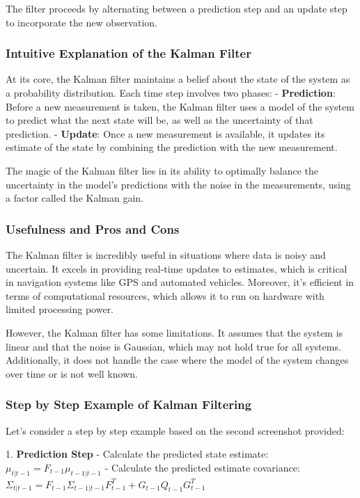 \documentclass{article}
\begin{document}
The filter proceeds by alternating between a prediction step and an update step to incorporate the new observation.

\subsubsection{Intuitive Explanation of the Kalman Filter}

At its core, the Kalman filter maintains a belief about the state of the system as a probability distribution. Each time step involves two phases:
- \textbf{Prediction}: Before a new measurement is taken, the Kalman filter uses a model of the system to predict what the next state will be, as well as the uncertainty of that prediction.
- \textbf{Update}: Once a new measurement is available, it updates its estimate of the state by combining the prediction with the new measurement.

The magic of the Kalman filter lies in its ability to optimally balance the uncertainty in the model's predictions with the noise in the measurements, using a factor called the Kalman gain.

\subsubsection{Usefulness and Pros and Cons}

The Kalman filter is incredibly useful in situations where data is noisy and uncertain. It excels in providing real-time updates to estimates, which is critical in navigation systems like GPS and automated vehicles. Moreover, it's efficient in terms of computational resources, which allows it to run on hardware with limited processing power.

However, the Kalman filter has some limitations. It assumes that the system is linear and that the noise is Gaussian, which may not hold true for all systems. Additionally, it does not handle the case where the model of the system changes over time or is not well known.

\subsubsection{Step by Step Example of Kalman Filtering}

Let's consider a step by step example based on the second screenshot provided:

1. \textbf{Prediction Step}
   - Calculate the predicted state estimate: \( \mu_{t|t-1} = F_{t-1}\mu_{t-1|t-1} \)
   - Calculate the predicted estimate covariance: \( \Sigma_{t|t-1} = F_{t-1}\Sigma_{t-1|t-1}F_{t-1}^T + G_{t-1}Q_{t-1}G_{t-1}^T \)
\end{document}
